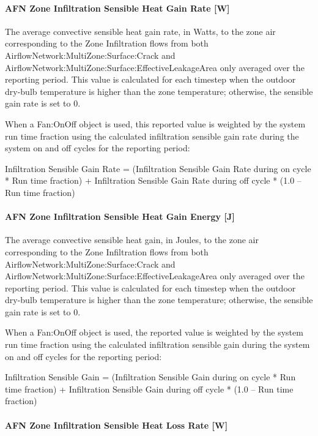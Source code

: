 \paragraph{AFN Zone Infiltration Sensible Heat Gain Rate {[}W{]}}\label{afn-zone-infiltration-sensible-heat-gain-rate-w}

The average convective sensible heat gain rate, in Watts, to the zone air corresponding to the Zone Infiltration flows from both AirflowNetwork:MultiZone:Surface:Crack and AirflowNetwork:MultiZone:Surface:EffectiveLeakageArea only averaged over the reporting period. This value is calculated for each timestep when the outdoor dry-bulb temperature is higher than the zone temperature; otherwise, the sensible gain rate is set to 0.

When a Fan:OnOff object is used, this reported value is weighted by the system run time fraction using the calculated infiltration sensible gain rate during the system on and off cycles for the reporting period:

Infiltration Sensible Gain Rate = (Infiltration Sensible Gain Rate during on cycle * Run time fraction) + Infiltration Sensible Gain Rate during off cycle * (1.0 -- Run time fraction)

\paragraph{AFN Zone Infiltration Sensible Heat Gain Energy {[}J{]}}\label{afn-zone-infiltration-sensible-heat-gain-energy-j}

The average convective sensible heat gain, in Joules, to the zone air corresponding to the Zone Infiltration flows from both AirflowNetwork:MultiZone:Surface:Crack and AirflowNetwork:MultiZone:Surface:EffectiveLeakageArea only  averaged over the reporting period. This value is calculated for each timestep when the outdoor dry-bulb temperature is higher than the zone temperature; otherwise, the sensible gain rate is set to 0.

When a Fan:OnOff object is used, the reported value is weighted by the system run time fraction using the calculated infiltration sensible gain during the system on and off cycles for the reporting period:

Infiltration Sensible Gain = (Infiltration Sensible Gain during on cycle * Run time fraction) + Infiltration Sensible Gain during off cycle * (1.0 -- Run time fraction)

\paragraph{AFN Zone Infiltration Sensible Heat Loss Rate {[}W{]}}\label{afn-zone-infiltration-sensible-heat-loss-rate-w}

